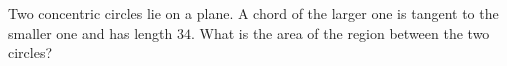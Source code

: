 Two concentric circles lie on a plane. A chord of the larger one is tangent to the smaller one and has length $34$. What is the area of the region between the two circles?